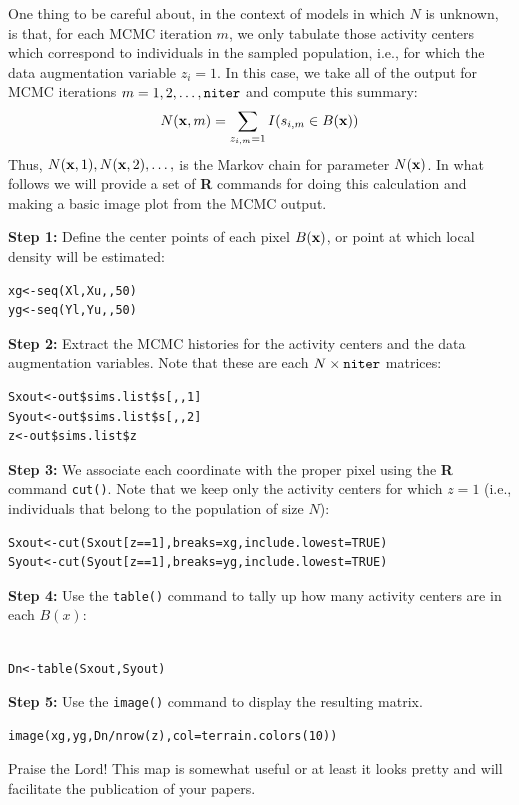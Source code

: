 One thing to be
careful about, in the context of models in which $N$ is unknown, is
that, for each MCMC iteration $m$, we only tabulate those activity
centers which correspond to individuals in the sampled
population, i.e., for which the data augmentation variable $z_{i} =
1$.  In this case, we take all of the output for MCMC iterations
$m=1,2,\ldots,\mbox{\tt niter}$ and compute this summary:
\[
   N({\bf x},m) = \sum_{z_{i,m}=1} I(s_{i,m} \in B({\bf x}))
\]
Thus, $N({\bf x},1),N({\bf x},2),\dots,$ is the Markov chain for
parameter $N({\bf x})$.  In what follows we will provide a set of {\bf
  R} commands for doing this calculation and making a basic image
plot from the MCMC output.

{\flushleft \bf Step 1:} Define the center points of each pixel $B({\bf
  x})$, or point at which local density will be estimated:
\begin{verbatim}
xg<-seq(Xl,Xu,,50)
yg<-seq(Yl,Yu,,50)
\end{verbatim}

{\flushleft \bf Step 2:} Extract the MCMC histories for the activity
centers and the data augmentation variables.  Note that these are each
$N \times \mbox{\tt niter}$ matrices:
\begin{verbatim}
Sxout<-out$sims.list$s[,,1]
Syout<-out$sims.list$s[,,2]
z<-out$sims.list$z
\end{verbatim}

{\flushleft \bf Step 3:} We associate each coordinate with the proper
pixel using the {\bf R} command \mbox{\tt cut()}. Note that we keep only
the activity centers for which $z=1$ (i.e., individuals that belong to
the population of size $N$):
\begin{verbatim}
Sxout<-cut(Sxout[z==1],breaks=xg,include.lowest=TRUE)
Syout<-cut(Syout[z==1],breaks=yg,include.lowest=TRUE)
\end{verbatim}

{\flushleft \bf Step 4:} Use the \mbox{\tt table()} command to tally
up how many activity centers are in each $B(x)$:
\begin{verbatim}

Dn<-table(Sxout,Syout)
\end{verbatim}

{\flushleft \bf Step 5:} Use the \mbox{\tt image()} command to display
the resulting matrix.
\begin{verbatim}
image(xg,yg,Dn/nrow(z),col=terrain.colors(10))
\end{verbatim}
Praise the Lord! This map is somewhat useful or at least it looks
pretty and will facilitate the publication of your papers.


